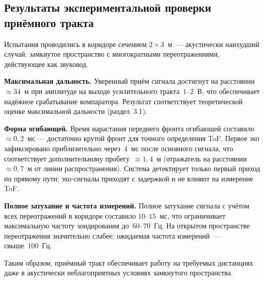 \documentclass[a4paper,11pt]{article} %
\begin{document}
\FloatBarrier

\subsection{Результаты экспериментальной проверки приёмного тракта}
\label{sec:exp}

Испытания проводились в коридоре сечением $2{\times}3$~м~--- акустически
наихудший случай: замкнутое пространство с многократными переотражениями,
действующее как звуковод.

\textbf{Максимальная дальность.}
Уверенный приём сигнала достигнут на расстоянии~${\approx}34$~м при амплитуде
на выходе усилительного тракта~$1\text{--}2$~В, что обеспечивает надёжное срабатывание
компаратора. Результат соответствует теоретической оценке максимальной дальности
(раздел~3.1).

\textbf{Форма огибающей.}
Время нарастания переднего фронта огибающей составило~${\approx}0{,}2$~мс ---
достаточно крутой фронт для точного определения ToF.
Первое эхо зафиксировано приблизительно через~4~мс после основного сигнала,
что соответствует дополнительному пробегу~${\approx}1{,}4$~м (отражатель
на расстоянии~${\approx}0{,}7$~м от линии распространения).
Система детектирует только первый приход по прямому пути;
эхо-сигналы приходят с задержкой и не влияют на измерение ToF.

\textbf{Полное затухание и частота измерений.}
Полное затухание сигнала с учётом всех переотражений в коридоре составило
$10\text{--}15$~мс, что ограничивает максимальную частоту зондирования до~$60\text{--}70$~Гц.
На открытом пространстве переотражения значительно слабее; ожидаемая частота
измерений~--- свыше~100~Гц.

Таким образом, приёмный тракт обеспечивает работу на требуемых дистанциях
даже в акустически неблагоприятных условиях замкнутого пространства.

\FloatBarrier
\end{document}

